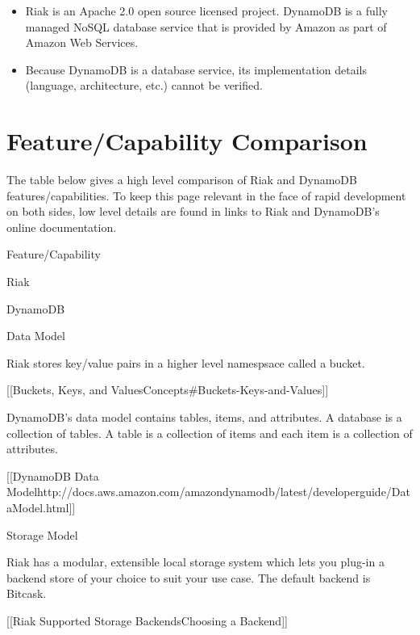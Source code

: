\documentclass[letter]{book}
\newcounter{tab}[chapter]
\begin{document}
\begin{itemize}
\itemsep1pt\parskip0pt
\item
  Riak is an Apache 2.0 open source licensed project. DynamoDB is a fully managed NoSQL database service that is provided by Amazon as part of Amazon Web Services.
\item
  Because DynamoDB is a database service, its implementation details (language, architecture, etc.) cannot be verified.
\end{itemize}

\section{Feature/Capability Comparison}\label{featurecapability-comparison-3}

The table below gives a high level comparison of Riak and DynamoDB features/capabilities. To keep this page relevant in the face of rapid development on both sides, low level details are found in links to Riak and DynamoDB's online documentation.

Feature/Capability

Riak

DynamoDB

Data Model

Riak stores key/value pairs in a higher level namespsace called a bucket.

{[}{[}Buckets, Keys, and Values\textbar{}Concepts\#Buckets-Keys-and-Values{]}{]}

DynamoDB's data model contains tables, items, and attributes. A database is a collection of tables. A table is a collection of items and each item is a collection of attributes.

{[}{[}DynamoDB Data Model\textbar{}http://docs.aws.amazon.com/amazondynamodb/latest/developerguide/DataModel.html{]}{]}

Storage Model

Riak has a modular, extensible local storage system which lets you plug-in a backend store of your choice to suit your use case. The default backend is Bitcask.

{[}{[}Riak Supported Storage Backends\textbar{}Choosing a Backend{]}{]}
\end{document}
